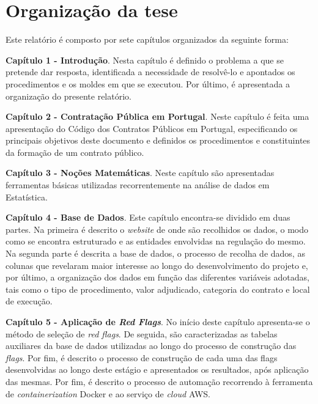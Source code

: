 \section{Organização da tese}

Este relatório é composto por sete capítulos organizados da seguinte forma: 

\begin{my_itemize}


	\item \textbf{Capítulo 1 - Introdução}. Nesta capítulo é definido o problema a que se pretende dar resposta, identificada a necessidade de resolvê-lo  e apontados os procedimentos e os moldes em que se executou. Por último, é apresentada a organização do presente relatório. 
	
	
	\item \textbf{Capítulo 2 - Contratação Pública em Portugal}. Neste capítulo é feita uma apresentação do Código dos Contratos Públicos em Portugal, especificando os principais objetivos deste documento e definidos os procedimentos e constituintes da formação de um contrato público.

	
	\item \textbf{Capítulo 3 - Noções Matemáticas}. Neste capítulo são apresentadas ferramentas básicas utilizadas recorrentemente na análise de dados em Estatística. %

	
	\item \textbf{Capítulo 4 - Base de Dados}. Este capítulo encontra-se dividido em duas partes. Na primeira é descrito o \textit{website} de onde são recolhidos os dados, o modo como se encontra estruturado e as entidades envolvidas na regulação do mesmo. Na segunda parte é descrita a base de dados, o processo de recolha de dados, as colunas que revelaram maior interesse ao longo do desenvolvimento do projeto e, por último, a organização dos dados em função das diferentes variáveis adotadas, tais como o tipo de procedimento, valor adjudicado, categoria do contrato e local de execução.


	\item \textbf{Capítulo 5 - Aplicação de \textit{Red Flags}}. No início deste capítulo apresenta-se o método de seleção de \textit{red flags}. De seguida, são caracterizadas as tabelas auxiliares da base de dados utilizadas ao longo do processo de construção das \textit{flags}. Por fim, é descrito o processo de construção de cada uma das flags desenvolvidas ao longo deste estágio e apresentados os resultados, após aplicação das mesmas. Por fim, é descrito o processo de automação recorrendo à ferramenta de \textit{containerization} Docker e ao serviço de \textit{cloud} AWS.


\end{my_itemize}
